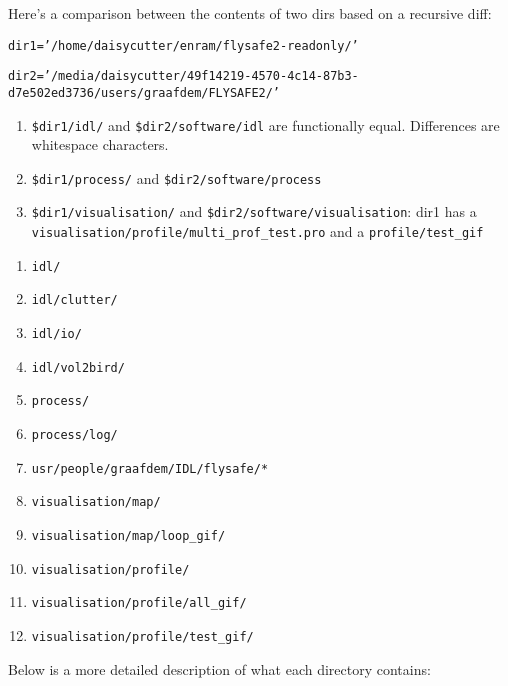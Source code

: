 Here's a comparison between the contents of two dirs based on a recursive diff:



\texttt{dir1='/home/daisycutter/enram/flysafe2-readonly/'}

\texttt{dir2='/media/daisycutter/49f14219-4570-4c14-87b3-d7e502ed3736/users/graafdem/FLYSAFE2/'}

\begin{enumerate}
\item{\texttt{\$dir1/idl/} and \texttt{\$dir2/software/idl} are functionally equal. Differences are whitespace characters.}
\item{\texttt{\$dir1/process/} and \texttt{\$dir2/software/process}}
\item{\texttt{\$dir1/visualisation/} and \texttt{\$dir2/software/visualisation}: dir1 has a \texttt{visualisation/profile/multi\_prof\_test.pro} and a \texttt{profile/test\_gif}}
\end{enumerate}


\begin{enumerate}

\item{\texttt{idl/}}
\item{\texttt{idl/clutter/}}
\item{\texttt{idl/io/}}
\item{\texttt{idl/vol2bird/}}
\item{\texttt{process/}}
\item{\texttt{process/log/}}
\item{\texttt{usr/people/graafdem/IDL/flysafe/*}}
\item{\texttt{visualisation/map/}}
\item{\texttt{visualisation/map/loop\_gif/}}
\item{\texttt{visualisation/profile/}}
\item{\texttt{visualisation/profile/all\_gif/}}
\item{\texttt{visualisation/profile/test\_gif/}}
\end{enumerate}
Below is a more detailed description of what each directory contains:

